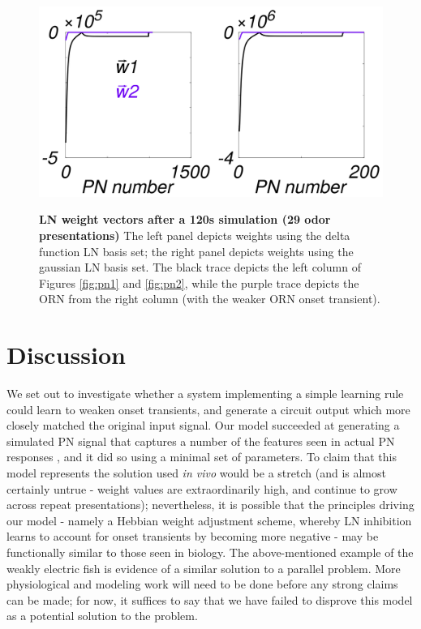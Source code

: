 \documentclass[a4paper,12pt,twoside]{article}
\begin{document}
\begin{figure}
\centering
\caption{\textbf{LN weight vectors after a 120s simulation (29 odor presentations)}  The left panel depicts weights using the delta function LN basis set; the right panel depicts weights using the gaussian LN basis set.  The black trace depicts the left column of Figures \ref{fig:pn1} and \ref{fig:pn2}, while the purple trace depicts the ORN from the right column (with the weaker ORN onset transient). }
\includegraphics[scale=0.5]{2016-09-02_Delta_Gauss_weights.png}
\label{fig:weights}
\end{figure}

\section{Discussion}
We set out to investigate whether a system implementing a simple learning rule could learn to weaken onset transients, and generate a circuit output which more closely matched the original input signal.  Our model succeeded at generating a simulated PN signal that captures a number of the features seen in actual PN responses \cite{Nagel2015}, and it did so using a minimal set of parameters.  To claim that this model represents the solution used \textit{in vivo} would be a stretch (and is almost certainly untrue - weight values are extraordinarily high, and continue to grow across repeat presentations); nevertheless, it is possible that the principles driving our model - namely a Hebbian weight adjustment scheme, whereby LN inhibition learns to account for onset transients by becoming more negative - may be functionally similar to those seen in biology.  The above-mentioned example of the weakly electric fish is evidence of a similar solution to a parallel problem.  More physiological and modeling work will need to be done before any strong claims can be made; for now, it suffices to say that we have failed to disprove this model as a potential solution to the problem.
\end{document}
